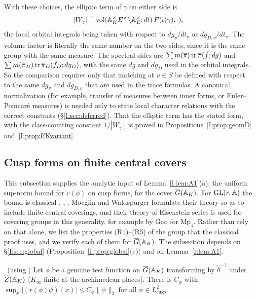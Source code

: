 With these choices, the elliptic term of $\gamma$ on either side is \[ |W_\gamma|^{-1}\operatorname{vol}(\mathbb{A}_K^\times E^\times\backslash\mathbb{A}_E^\times;dt)\,F(\iota(\gamma),\cdot), \] the local orbital integrals being taken with respect to $dg_v/dt_v$ or $dg_{D,v}/dt_v$. The volume factor is literally the same number on the two sides, since it is the same group with the same measure. The spectral sides are $\sum m(\overline{\pi})\operatorname{tr}\overline{\pi}(\tilde f;dg)$ and $\sum m(\overline{\pi}_D)\operatorname{tr}\overline{\pi}_D(\tilde f_D;dg_D)$, with the same $dg$ and $dg_D$ used in the orbital integrals. So the comparison requires only that matching at $v\in S$ be defined with respect to the same $dg_v$ and $dg_{D,v}$ that are used in the trace formulas. A canonical normalization (for example, transfer of measures between inner forms, or Euler--Poincar\'e measures) is needed only to state local character relations with the correct constants (\S\ref{I:sec:deferred}). That the elliptic term has the stated form, with the class-counting constant $1/|W_\gamma|$, is proved in Propositions~\ref{I:prop:geomD} and~\ref{I:prop:FKvariant}.

\subsection{Cusp forms on finite central covers}\label{I:app:cusp}
This subsection supplies the analytic input of Lemma~\ref{I:lem:A1}(a): the uniform sup-norm bound for $r(\phi)$ on cusp forms, for the cover $\overline{G}(\mathbb{A}_K)$. For $\mathrm{GL}(r,\mathbb{A})$ the bound is classical \cite[Ch.~3]{GGPS69}, \cite{God66}, \cite[I.2]{MW95}. Moeglin and Waldspurger formulate their theory so as to include finite central coverings, and their theory of Eisenstein series is used for covering groups in this generality, for example by Gao \cite{Gao12} for $\mathrm{Mp}_4$. Rather than rely on that alone, we list the properties (R1)--(R5) of the group that the classical proof uses, and we verify each of them for $\overline{G}(\mathbb{A}_K)$. The subsection depends on \S\ref{I:sec:global} (Proposition~\ref{I:prop:global}(e)) and on Lemma~\ref{I:lem:A1}.

\begin{lemma}\label{I:lem:Bsup}\ (using \Ev)
Let $\phi$ be a genuine test function on $\overline{G}(\mathbb{A}_K)$ transforming by $\tilde\theta^{-1}$ under $\overline{Z}(\mathbb{A}_K)$ ($K_\infty$-finite at the archimedean places). There is $C_\phi$ with $\sup_x|(r(\phi)\psi)(x)|\le C_\phi\|\psi\|_2$ for all $\psi\in L^2_{\mathrm{cusp}}$.
\end{lemma}

